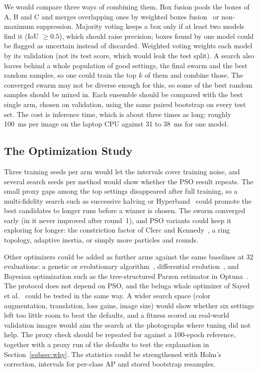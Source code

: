 We would compare three ways of combining them. Box fusion pools the boxes of A, B and C and merges overlapping ones by weighted boxes fusion~\cite{solovyev2021weighted} or non-maximum suppression. Majority voting keeps a box only if at least two models find it (IoU $\ge 0.5$), which should raise precision; boxes found by one model could be flagged as uncertain instead of discarded. Weighted voting weights each model by its validation \mapfifty (not its test score, which would leak the test split). A search also leaves behind a whole population of good settings, the final swarm and the best random samples, so one could train the top $k$ of them and combine those. The converged swarm may not be diverse enough for this, so some of the best random samples should be mixed in. Each ensemble should be compared with the best single arm, chosen on validation, using the same paired bootstrap on every test set. The cost is inference time, which is about three times as long: roughly 100~ms per image on the laptop CPU against 31 to 38~ms for one \genone model.

\subsection{The Optimization Study}
\label{subsec:fw-opt}

Three training seeds per arm would let the intervals cover training noise, and several search seeds per method would show whether the PSO result repeats. The small proxy gaps among the top settings disappeared after full training, so a multi-fidelity search such as successive halving or Hyperband~\cite{li2018hyperband} could promote the best candidates to longer runs before a winner is chosen. The swarm converged early (in \gentwo it never improved after round~1), and PSO variants could keep it exploring for longer: the constriction factor of Clerc and Kennedy~\cite{clerc2002particle}, a ring topology, adaptive inertia, or simply more particles and rounds.

Other optimizers could be added as further arms against the same baselines at 32 evaluations: a genetic or evolutionary algorithm~\cite{young2015optimizing}, differential evolution~\cite{storn1997differential}, and Bayesian optimization such as the tree-structured Parzen estimator in Optuna~\cite{akiba2019optuna}. The protocol does not depend on PSO, and the beluga whale optimizer of Sayed et al.~\cite{sayed2024intelligent} could be tested in the same way. A wider search space (color augmentation, translation, loss gains, image size) would show whether six settings left too little room to beat the defaults, and a fitness scored on real-world validation images would aim the search at the photographs where tuning did not help. The proxy check should be repeated for \gentwo against a 100-epoch reference, together with a proxy run of the defaults to test the explanation in Section~\ref{subsec:why}. The statistics could be strengthened with Holm's correction, intervals for per-class AP and stored bootstrap resamples.

